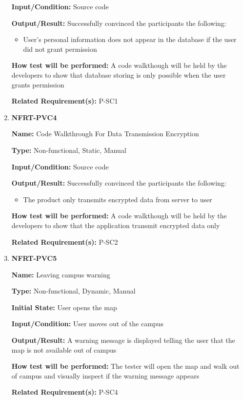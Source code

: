 \documentclass[12pt, titlepage]{article}
\begin{document}
\begin{enumerate}
\textbf{Input/Condition:} Source code

\textbf{Output/Result:} Successfully convinced the participants the following:
\begin{itemize}
  \item User's personal information does not appear in the database if the user did not grant permission
\end{itemize}

\textbf{How test will be performed:} A code walkthough will be held by the developers to show that database storing is only possible when the user grants permission

\textbf{Related Requirement(s):} P-SC1

\item{\textbf{NFRT-PVC4}}

\textbf{Name:} Code Walkthrough For Data Transmission Encryption

\textbf{Type:} Non-functional, Static, Manual

\textbf{Input/Condition:} Source code

\textbf{Output/Result:} Successfully convinced the participants the following:
\begin{itemize}
  \item The product only transmits encrypted data from server to user
\end{itemize}

\textbf{How test will be performed:}  A code walkthough will be held by the developers to show that the application transmit encrypted data only

\textbf{Related Requirement(s):} P-SC2

\item{\textbf{NFRT-PVC5}}

\textbf{Name:} Leaving campus warning

\textbf{Type:} Non-functional, Dynamic, Manual
					
\textbf{Initial State:} User opens the map
					
\textbf{Input/Condition:} User moves out of the campus
					
\textbf{Output/Result:} A warning message is displayed telling the user that the map is not available out of campus

\textbf{How test will be performed:} The tester will open the map and walk out of campus and visually inspect if the warning message appears

\textbf{Related Requirement(s):} P-SC4
\end{enumerate}
\end{document}
